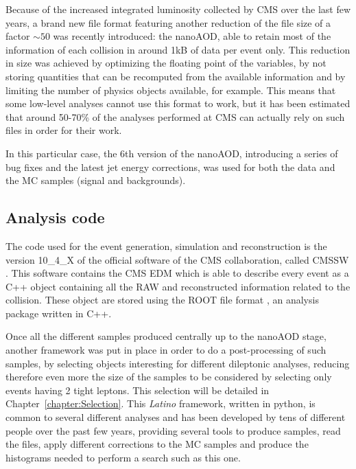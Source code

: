 \documentclass[a4paper, 10pt, openright]{report}
\begin{document}
Because of the increased integrated luminosity collected by \ac{CMS} over the last few years, a brand new file format featuring another reduction of the file size of a factor $\sim 50$ was recently introduced: the nanoAOD, able to retain most of the information of each collision in around 1kB of data per event only. This reduction in size was achieved by optimizing the floating point of the variables, by not storing quantities that can be recomputed from the available information and by limiting the number of physics objects available, for example. This means that some low-level analyses cannot use this format to work, but it has been estimated that around 50-70\% of the analyses performed at \ac{CMS} can actually rely on such files in order for their work. 

In this particular case, the 6th version of the nanoAOD, introducing a series of bug fixes and the latest jet energy corrections, was used for both the data and the \ac{MC} samples (signal and backgrounds). 

\subsection{Analysis code} \label{section:Code}

The code used for the event generation, simulation and reconstruction is the version 10\_4\_X of the official software of the \ac{CMS} collaboration, called CMSSW \cite{CMSSW}. This software contains the \ac{CMS} \ac{EDM} which is able to describe every event as a C++ object containing all the RAW and reconstructed information related to the collision. These object are stored using the ROOT file format \cite{ROOT}, an analysis package written in C++. 

Once all the different samples produced centrally up to the nanoAOD stage, another framework was put in place in order to do a post-processing of such samples, by selecting objects interesting for different dileptonic analyses, reducing therefore even more the size of the samples to be considered by selecting only events having 2 tight leptons. This selection will be detailed in Chapter~\ref{chapter:Selection}. This \textit{Latino} framework, written in python, is common to several different analyses and has been developed by tens of different people over the past few years, providing several tools to produce samples, read the files, apply different corrections to the \ac{MC} samples and produce the histograms needed to perform a search such as this one.
\end{document}
